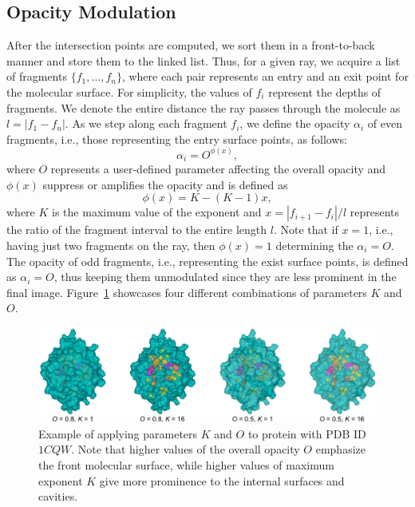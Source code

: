 \subsection{Opacity Modulation}\label{sec:opacity}
After the intersection points are computed, we sort them in a front-to-back manner and store them to the linked list. 
Thus, for a given ray, we acquire a list of fragments $\{f_1,\ldots,f_n \}$, where each pair represents an entry and an exit point for the molecular surface. For simplicity, the values of $f_i$ represent the depths of fragments. 
We denote the entire distance the ray passes through the molecule as $l=|f_1-f_n|$. 
As we step along each fragment $f_i$, we define the opacity $\alpha_i$ of even fragments, i.e., those representing the entry surface points, as follows:
\begin{equation}
  \alpha_i = O^{\phi(x)},
	\label{eq:alphaDistEven}
\end{equation}	
where $O$ represents a user-defined parameter affecting the overall opacity and $\phi(x)$ suppress or amplifies the opacity and is defined as
\begin{equation}
  \phi(x) = K-(K-1)x,
	\label{eq:exponent}
\end{equation}	
where $K$ is the maximum value of the exponent and $x=|f_{i+1}-f_i|/l$ represents the ratio of the fragment interval to the entire length $l$. Note that if $x=1$, i.e., having just two fragments on the ray, then $\phi(x)=1$ determining the $\alpha_i=O$. The opacity of odd fragments, i.e., representing the exist surface points, is defined as $\alpha_i = O$, thus keeping them unmodulated since they are less prominent in the final image.
Figure~\ref{fig:Oparam} showcases four different combinations of parameters $K$ and $O$.
\begin{figure}[htb]
  \centering
  \includegraphics[width=\textwidth]{image/Oparam2.pdf}
  \caption{Example of applying parameters $K$ and $O$ to protein with PDB ID $1CQW$. Note that higher values of the overall opacity $O$ emphasize the front molecular surface, while higher values of maximum exponent $K$ give more prominence to the internal surfaces and cavities.}
	\label{fig:Oparam}
\end{figure}

